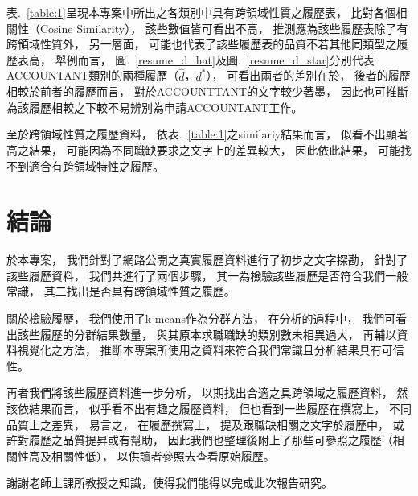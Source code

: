 \documentclass[acmsmall]{acmart}
\begin{document}
表.~\ref{table:1}呈現本專案中所出之各類別中具有跨領域性質之履歷表，
比對各個相關性（Cosine Similarity），
該些數值皆可看出不高，
推測應為該些履歷表除了有跨領域性質外，
另一層面，
可能也代表了該些履歷表的品質不若其他同類型之履歷表高，
舉例而言，
圖.~\ref{resume_d_hat}及圖.~\ref{resume_d_star}分別代表ACCOUNTANT類別的兩種履歷（$\hat{d}$，$d^{*}$），
可看出兩者的差別在於，
後者的履歷相較於前者的履歷而言，
對於ACCOUNTTANT的文字較少著墨，
因此也可推斷為該履歷相較之下較不易辨別為申請ACCOUNTANT工作。

至於跨領域性質之履歷資料，
依表.~\ref{table:1}之similariy結果而言，
似看不出顯著高之結果，
可能因為不同職缺要求之文字上的差異較大，
因此依此結果，
可能找不到適合有跨領域特性之履歷。

\section{結論}

於本專案，
我們針對了網路公開之真實履歷資料進行了初步之文字探勘，
針對了該些履歷資料，
我們共進行了兩個步驟，
其一為檢驗該些履歷是否符合我們一般常識，
其二找出是否具有跨領域性質之履歷。

關於檢驗履歷，
我們使用了k-means作為分群方法，
在分析的過程中，
我們可看出該些履歷的分群結果數量，
與其原本求職職缺的類別數未相異過大，
再輔以資料視覺化之方法，
推斷本專案所使用之資料來符合我們常識且分析結果具有可信性。

再者我們將該些履歷資料進一步分析，
以期找出合適之具跨領域之履歷資料，
然該依結果而言，
似乎看不出有趣之履歷資料，
但也看到一些履歷在撰寫上，
不同品質上之差異，
易言之，
在履歷撰寫上，
提及跟職缺相關之文字於履歷中，
或許對履歷之品質提昇或有幫助，
因此我們也整理後附上了那些可參照之履歷（相關性高及相關性低），
以供讀者參照去查看原始履歷。

\begin{acks}
    謝謝老師上課所教授之知識，使得我們能得以完成此次報告研究。
\end{acks}



\end{document}
